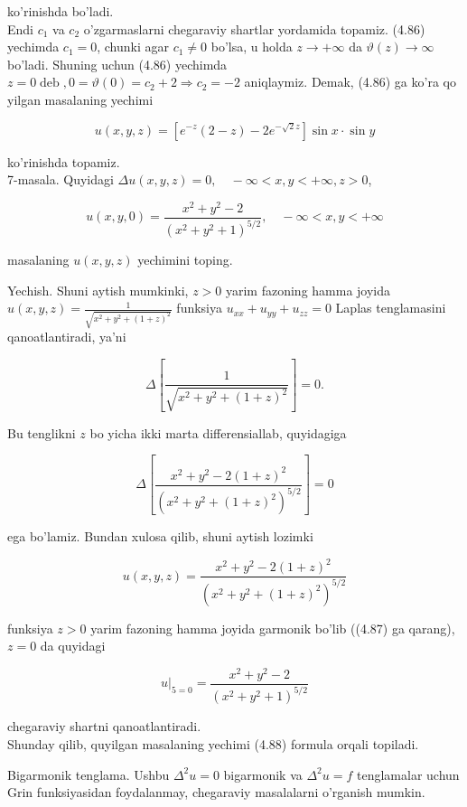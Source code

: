 \documentclass[10pt]{article}
\begin{document}
ko'rinishda bo'ladi.\\
Endi $c_{1}$ va $c_{2}$ o'zgarmaslarni chegaraviy shartlar yordamida topamiz. (4.86) yechimda $c_{1}=0$, chunki agar $c_{1} \neq 0$ bo'lsa, u holda $z \rightarrow+\infty$ da $\vartheta(z) \rightarrow \infty$ bo'ladi. Shuning uchun (4.86) yechimda $z=0 \operatorname{deb}, 0=\vartheta(0)=c_{2}+2 \Rightarrow c_{2}=-2$ aniqlaymiz. Demak, (4.86) ga ko'ra qo yilgan masalaning yechimi

$$
u(x, y, z)=\left[e^{-z}(2-z)-2 e^{-\sqrt{2} z}\right] \sin x \cdot \sin y
$$

ko'rinishda topamiz.\\
7-masala. Quyidagi $\Delta u(x, y, z)=0, \quad-\infty<x, y<+\infty, z>0$,

$$
u(x, y, 0)=\frac{x^{2}+y^{2}-2}{\left(x^{2}+y^{2}+1\right)^{5 / 2}}, \quad-\infty<x, y<+\infty
$$

masalaning $u(x, y, z)$ yechimini toping.

Yechish. Shuni aytish mumkinki, $z>0$ yarim fazoning hamma joyida $u(x, y, z)=\frac{1}{\sqrt{x^{2}+y^{2}+(1+z)^{2}}}$ funksiya $u_{x x}+u_{y y}+u_{z z}=0$ Laplas tenglamasini qanoatlantiradi, ya'ni

$$
\Delta\left[\frac{1}{\sqrt{x^{2}+y^{2}+(1+z)^{2}}}\right]=0 .
$$

Bu tenglikni $z$ bo yicha ikki marta differensiallab, quyidagiga


\begin{equation*}
\Delta\left[\frac{x^{2}+y^{2}-2(1+z)^{2}}{\left(x^{2}+y^{2}+(1+z)^{2}\right)^{5 / 2}}\right]=0 \tag{4.87}
\end{equation*}


ega bo'lamiz. Bundan xulosa qilib, shuni aytish lozimki


\begin{equation*}
u(x, y, z)=\frac{x^{2}+y^{2}-2(1+z)^{2}}{\left(x^{2}+y^{2}+(1+z)^{2}\right)^{5 / 2}} \tag{4.88}
\end{equation*}


funksiya $z>0$ yarim fazoning hamma joyida garmonik bo'lib ((4.87) ga qarang), $z=0$ da quyidagi

$$
\left.u\right|_{5=0}=\frac{x^{2}+y^{2}-2}{\left(x^{2}+y^{2}+1\right)^{5 / 2}}
$$

chegaraviy shartni qanoatlantiradi.\\
Shunday qilib, quyilgan masalaning yechimi (4.88) formula orqali topiladi.

Bigarmonik tenglama. Ushbu $\Delta^{2} u=0$ bigarmonik va $\Delta^{2} u=f$ tenglamalar uchun Grin funksiyasidan foydalanmay, chegaraviy masalalarni o'rganish mumkin.
\end{document}
